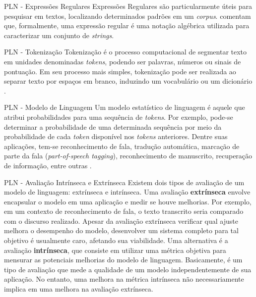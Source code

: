 \documentclass{beamer}
\begin{document}
    \begin{frame}{PLN - Expressões Regulares}
        Expressões Regulares são particularmente úteis para pesquisar em textos, localizando determinados padrões em um \textit{corpus}. \citet{jurafsky2021} comentam que, formalmente, uma expressão regular é uma notação algébrica utilizada para caracterizar um conjunto de \textit{strings}.
    \end{frame}
    
    \begin{frame}{PLN - Tokenização}
        Tokenização é o processo computacional de segmentar texto em unidades denominadas \textit{tokens}, podendo ser palavras, números ou sinais de pontuação. Em seu processo mais simples, tokenização pode ser realizada ao separar texto por espaços em branco, induzindo um vocabulário ou um dicionário \citep{kamath2019, jurafsky2021}.
    \end{frame}
    
    \begin{frame}{PLN - Modelo de Linguagem}
        Um modelo estatístico de linguagem é aquele que atribui probabilidades para uma sequência de \textit{tokens}. Por exemplo, pode-se determinar a probabilidade de uma determinada sequência por meio da probabilidade de cada \textit{token} disponível nos \textit{tokens} anteriores. Dentre suas aplicações, tem-se reconhecimento de fala, tradução automática, marcação de parte da fala (\textit{part-of-speech tagging}), reconhecimento de manuscrito, recuperação de informação, entre outras \citep{kamath2019, jurafsky2021}.
    \end{frame}

    \begin{frame}{PLN - Avaliação Intrínseca e Extrínseca}
        Existem dois tipos de avaliação de um modelo de linguagem: extrínseca e intrínseca. Uma avaliação \textbf{extrínseca} envolve encapsular o modelo em uma aplicação e medir se houve melhorias. Por exemplo, em um contexto de reconhecimento de fala, o texto transcrito seria comparado com o discurso realizado. Apesar da avaliação extrínseca verificar qual ajuste melhora o desempenho do modelo, desenvolver um sistema completo para tal objetivo é usualmente caro, afetando sua viabilidade. Uma alternativa é a avaliação \textbf{intrínseca}, que consiste em utilizar uma métrica objetiva para mensurar as potenciais melhorias do modelo de linguagem. Basicamente, é um tipo de avaliação que mede a qualidade de um modelo independentemente de sua aplicação. No entanto, uma melhora na métrica intrínseca não necessariamente implica em uma melhora na avaliação extrínseca.
    \end{frame}
    
\end{document}
